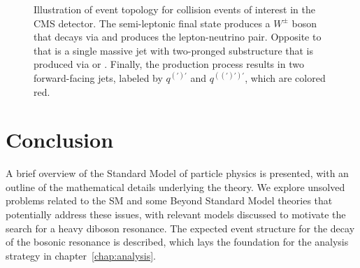 \begin{figure}[htbp]
  \centering
  
  \caption{
    Illustration of event topology for collision events of interest in the CMS detector.
    The semi-leptonic final state produces a $W^\pm$ boson that decays via \Wtolnu and produces the lepton-neutrino pair.
    Opposite to that is a single massive jet with two-pronged substructure that is produced via \Vtoqqbarpr or \Htobbbar.
    Finally, the \VBF production process results in two forward-facing jets, labeled by $q^{(\prime)\prime}$ and $q^{((\prime)\prime)\prime}$, which are colored red.
  }
  \label{fig:eventTop}
\end{figure}

\section{Conclusion}

A brief overview of the Standard Model of particle physics is presented, with an outline of the mathematical details underlying the theory.
We explore unsolved problems related to the SM and some Beyond Standard Model theories that potentially address these issues, with relevant models discussed to motivate the search for a heavy diboson resonance.
The expected event structure for the decay of the bosonic resonance is described, which lays the foundation for the analysis strategy in chapter~\ref{chap:analysis}.
